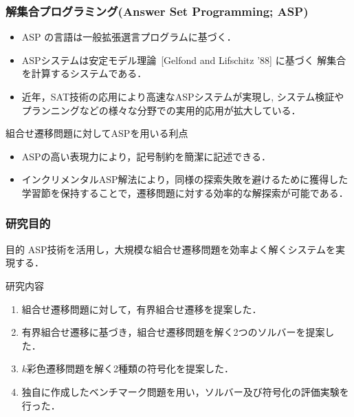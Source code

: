 \documentclass[dvipdfmx,11pt]{beamer}
\begin{document}
\begin{frame}\frametitle{解集合プログラミング(Answer Set Programming; ASP)}

  \begin{itemize}
    \item ASP の言語は一般拡張選言プログラムに基づく．
    \item ASPシステムは安定モデル理論~[Gelfond and Lifschitz '88] に基づく
          解集合を計算するシステムである．
    \item 近年，SAT技術の応用により高速なASPシステムが実現し, 
          システム検証やプランニングなどの様々な分野での実用的応用が拡大している．
  \end{itemize}

  \begin{alertblock}{組合せ遷移問題に対してASPを用いる利点}
    \begin{itemize}
      \item ASPの高い表現力により，記号制約を簡潔に記述できる．
      \item インクリメンタルASP解法により，同様の探索失敗を避けるために獲得した学習節を保持することで，遷移問題に対する効率的な解探索が可能である．
    \end{itemize}
  \end{alertblock}
  
\end{frame}

\begin{frame}\frametitle{研究目的}

  \begin{alertblock}{目的}
    ASP技術を活用し，大規模な組合せ遷移問題を効率よく解くシステムを実現する．
  \end{alertblock}

  \begin{block}{研究内容}
    \begin{enumerate}
    \item 組合せ遷移問題に対して，有界組合せ遷移を提案した．
    \item 有界組合せ遷移に基づき，組合せ遷移問題を解く2つのソルバーを提案した．
    \item $k$彩色遷移問題を解く2種類の符号化を提案した．
    \item 独自に作成したベンチマーク問題を用い，ソルバー及び符号化の評価実験を行った．
    \end{enumerate}
  \end{block}

\end{frame}
\end{document}

